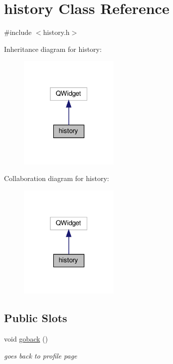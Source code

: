 \hypertarget{classhistory}{}\section{history Class Reference}
\label{classhistory}


{\ttfamily \#include $<$history.\+h$>$}



Inheritance diagram for history\+:
\nopagebreak
\begin{figure}[H]
\begin{center}
\leavevmode
\includegraphics[width=135pt]{classhistory__inherit__graph}
\end{center}
\end{figure}


Collaboration diagram for history\+:
\nopagebreak
\begin{figure}[H]
\begin{center}
\leavevmode
\includegraphics[width=135pt]{classhistory__coll__graph}
\end{center}
\end{figure}
\subsection*{Public Slots}
\begin{DoxyCompactItemize}
\item 
void \hyperlink{classhistory_ab0427d7cf35a054fc4ceff78068146bf}{goback} ()
\begin{DoxyCompactList}\small\item\em goes back to profile page \end{DoxyCompactList}\end{DoxyCompactItemize}
